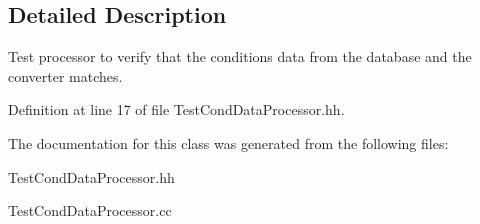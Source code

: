 \subsection{Detailed Description}
Test processor to verify that the conditions data from the database and the converter matches. 

Definition at line 17 of file Test\-Cond\-Data\-Processor.\-hh.



The documentation for this class was generated from the following files\-:\begin{DoxyCompactItemize}
\item 
Test\-Cond\-Data\-Processor.\-hh\item 
Test\-Cond\-Data\-Processor.\-cc\end{DoxyCompactItemize}

